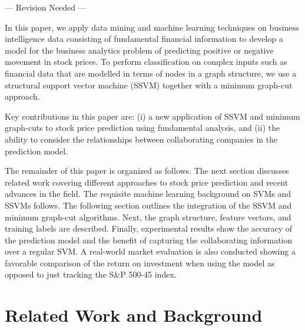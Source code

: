 --- Revision Needed ---



In this paper, we apply data mining and machine learning
techniques on business intelligence data consisting of
fundamental financial information to develop a model for the
business analytics problem of predicting positive or negative
movement in stock prices. To perform classification on complex
inputs such as financial data that are modelled in terms of nodes
in a graph structure, we use a structural support vector machine
(SSVM) together with a minimum graph-cut approach.

Key contributions in this paper are: (i) a new application of
SSVM and minimum graph-cuts to stock price prediction using
fundamental analysis, and (ii) the ability to consider the
relationships between collaborating companies in the prediction
model.

The remainder of this paper is organized as follows. The next
section discusses related work covering different approaches to
stock price prediction and recent advances in the field. The
requisite machine learning background on SVMs and SSVMs follows.
The following section outlines the integration of the SSVM and
minimum graph-cut algorithms. Next, the graph structure, feature
vectors, and training labels are described. Finally, experimental
results show the accuracy of the prediction model and the benefit
of capturing the collaborating information over a regular SVM. A
real-world market evaluation is also conducted showing a
favorable comparison of the return on investment when using the
model as opposed to just tracking the S\&P 500-45 index.


\section{Related Work and Background}
\label{sec:RelatedWorks}
